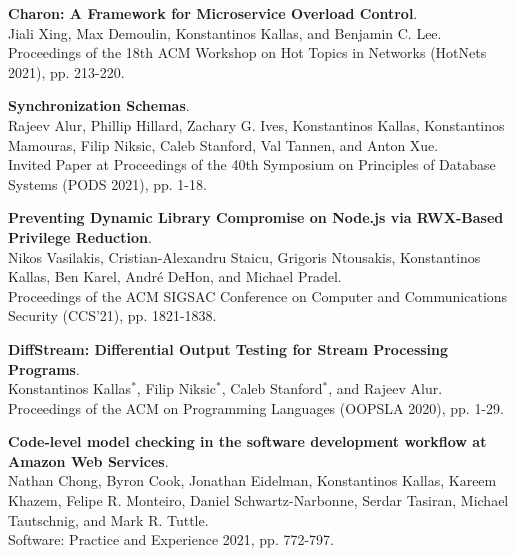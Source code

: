 \begin{minipage}{\textwidth}
\textbf{Charon: A Framework for Microservice Overload Control}. \\
Jiali Xing, Max Demoulin, Konstantinos Kallas, and Benjamin C. Lee. \\
Proceedings of the 18th ACM Workshop on Hot Topics in Networks (HotNets 2021), pp. 213-220.
\end{minipage}

\begin{minipage}{\textwidth}
\textbf{Synchronization Schemas}. \\
Rajeev Alur, Phillip Hillard, Zachary G. Ives, Konstantinos Kallas, Konstantinos Mamouras, Filip Niksic, Caleb Stanford, Val Tannen, and Anton Xue. \\
Invited Paper at Proceedings of the 40th Symposium on Principles of Database Systems (PODS 2021), pp. 1-18.
\end{minipage}



\begin{minipage}{\textwidth}
\textbf{Preventing Dynamic Library Compromise on Node.js via RWX-Based Privilege Reduction}. \\
Nikos Vasilakis, Cristian-Alexandru Staicu, Grigoris Ntousakis, Konstantinos Kallas, Ben Karel, André DeHon, and Michael Pradel. \\
Proceedings of the ACM SIGSAC Conference on Computer and Communications Security (CCS'21), pp. 1821-1838.
\end{minipage}

\begin{minipage}{\textwidth}
\textbf{DiffStream: Differential Output Testing for Stream Processing Programs}. \\
Konstantinos Kallas$^*$, Filip Niksic$^*$, Caleb Stanford$^*$, and Rajeev Alur. \\
Proceedings of the ACM on Programming Languages (OOPSLA 2020), pp. 1-29.
\end{minipage}

\begin{minipage}{\textwidth}
\textbf{Code-level model checking in the software development workflow at Amazon Web Services}. \\
Nathan Chong, Byron Cook, Jonathan Eidelman, Konstantinos Kallas, Kareem Khazem, Felipe R. Monteiro, Daniel Schwartz-Narbonne, Serdar Tasiran, Michael Tautschnig, and Mark R. Tuttle. \\
Software: Practice and Experience 2021, pp. 772-797.
\end{minipage}

